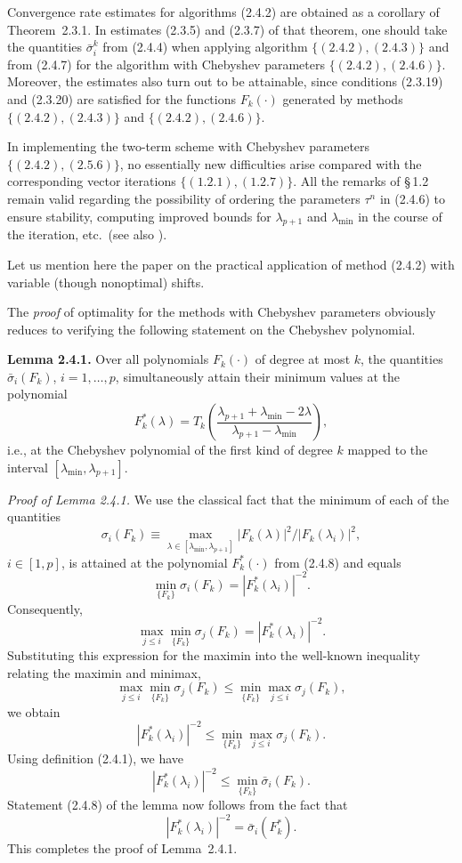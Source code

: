 \documentclass[11pt,oneside]{book}
\begin{document}
Convergence rate estimates for algorithms (2.4.2) are obtained as a corollary of Theorem~2.3.1. In estimates (2.3.5) and (2.3.7) of that theorem, one should take the quantities $\bar{\sigma}_i^k$ from (2.4.4) when applying algorithm $\{(2.4.2), (2.4.3)\}$ and from (2.4.7) for the algorithm with Chebyshev parameters $\{(2.4.2), (2.4.6)\}$. Moreover, the estimates also turn out to be attainable, since conditions (2.3.19) and (2.3.20) are satisfied for the functions $F_k(\cdot)$ generated by methods $\{(2.4.2), (2.4.3)\}$ and $\{(2.4.2), (2.4.6)\}$. %

In implementing the two-term scheme with Chebyshev parameters $\{(2.4.2), (2.5.6)\}$, no essentially new difficulties arise compared with the corresponding vector iterations $\{(1.2.1), (1.2.7)\}$. %
All the remarks of \S\,1.2 remain valid regarding the possibility of ordering the parameters $\tau^n$ in (2.4.6) to ensure stability, computing improved bounds for $\lambda_{p+1}$ and $\lambda_{\min}$ in the course of the iteration, etc.\ (see also \citep{WilkinsonReinsch1976ru}).

Let us mention here the paper \citep{AklDilgerIrons1982} on the practical application of method (2.4.2) with variable (though nonoptimal) shifts. %

The \textit{proof} of optimality for the methods with Chebyshev parameters obviously reduces to verifying the following statement on the Chebyshev polynomial.

\textbf{Lemma 2.4.1.} Over all polynomials $F_k(\cdot)$ of degree at most $k$, the quantities $\bar{\sigma}_i(F_k)$, $i = 1, \ldots, p$, simultaneously attain their minimum values at the polynomial
\[
F_k^*(\lambda) = T_k\left(\frac{\lambda_{p+1} + \lambda_{\min} - 2\lambda}{\lambda_{p+1} - \lambda_{\min}}\right), \tag{2.4.8}
\]
i.e., at the Chebyshev polynomial of the first kind of degree $k$ mapped to the interval $[\lambda_{\min}, \lambda_{p+1}]$.

\textit{Proof of Lemma 2.4.1.} We use the classical fact that the minimum of each of the quantities
\[
\sigma_i(F_k) \equiv \max_{\lambda \in [\lambda_{\min}, \lambda_{p+1}]} |F_k(\lambda)|^2 / |F_k(\lambda_i)|^2,
\]
$i \in [1, p]$, is attained at the polynomial $F_k^*(\cdot)$ from (2.4.8) and equals
\[
\min_{\{F_k\}} \sigma_i(F_k) = |F_k^*(\lambda_i)|^{-2}.
\]
Consequently,
\[
\max_{j \leqslant i} \min_{\{F_k\}} \sigma_j(F_k) = |F_k^*(\lambda_i)|^{-2}.
\]
Substituting this expression for the maximin into the well-known inequality relating the maximin and minimax,
\[
\max_{j \leqslant i} \min_{\{F_k\}} \sigma_j(F_k) \leqslant \min_{\{F_k\}} \max_{j \leqslant i} \sigma_j(F_k),
\]
we obtain
\[
|F_k^*(\lambda_i)|^{-2} \leqslant \min_{\{F_k\}} \max_{j \leqslant i} \sigma_j(F_k).
\]
Using definition (2.4.1), we have
\[
|F_k^*(\lambda_i)|^{-2} \leqslant \min_{\{F_k\}} \bar{\sigma}_i(F_k).
\]
Statement (2.4.8) of the lemma now follows from the fact that
\[
|F_k^*(\lambda_i)|^{-2} = \bar{\sigma}_i(F_k^*).
\]
This completes the proof of Lemma~2.4.1.
\end{document}
